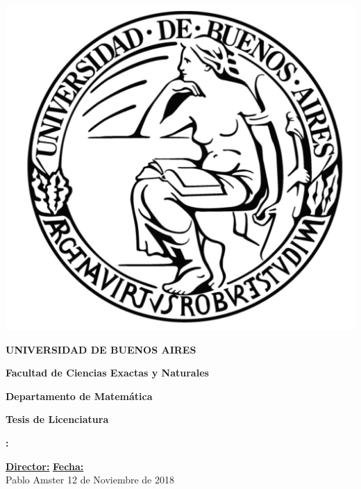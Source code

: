 \begin{titlepage}
    \thispagestyle{empty}
    
    \begin {center}
    \includegraphics[scale=.2]{gfx/uba.jpg}
    
    \medskip
    \textbf{UNIVERSIDAD DE BUENOS AIRES}
    
    \smallskip
    
    \textbf{Facultad de Ciencias Exactas y Naturales}
    
    \smallskip
    
    \textbf{Departamento de Matem\'atica}
    
    \vspace{3.5cm}
    
    \textbf{\large Tesis de Licenciatura}
    
    
    \vspace{1.5cm}
    
    \textbf{\large \myTitle : \mySubtitle}
    
    \vspace{1.5cm}
    
    
    \textbf{\myName}
    
    \end {center}
    
    
    \vspace{1.5cm}
    
\textbf{\underline{Director:}}
\hfill
\textbf{\underline{Fecha:}} \\
Pablo Amster
\hfill
12 de Noviembre de 2018
    
\end{titlepage}
